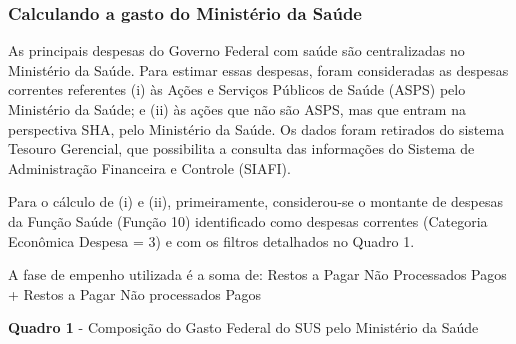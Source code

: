 \documentclass[
  letterpaper,
  DIV=11,
  numbers=noendperiod]{scrartcl}
\begin{document}
\hypertarget{calculando-a-gasto-do-ministuxe9rio-da-sauxfade}{%
\subsubsection{Calculando a gasto do Ministério da
Saúde}\label{calculando-a-gasto-do-ministuxe9rio-da-sauxfade}}

As principais despesas do Governo Federal com saúde são centralizadas no
Ministério da Saúde. Para estimar essas despesas, foram consideradas as
despesas correntes referentes (i) às Ações e Serviços Públicos de Saúde
(ASPS) pelo Ministério da Saúde; e (ii) às ações que não são ASPS, mas
que entram na perspectiva SHA, pelo Ministério da Saúde. Os dados foram
retirados do sistema Tesouro Gerencial, que possibilita a consulta das
informações do Sistema de Administração Financeira e Controle (SIAFI).

Para o cálculo de (i) e (ii), primeiramente, considerou-se o montante de
despesas da Função Saúde (Função 10) identificado como despesas
correntes (Categoria Econômica Despesa = 3) e com os filtros detalhados
no Quadro 1.

A fase de empenho utilizada é a soma de: Restos a Pagar Não Processados
Pagos + Restos a Pagar Não processados Pagos

\textbf{Quadro 1} - Composição do Gasto Federal do SUS pelo Ministério
da Saúde
\end{document}
